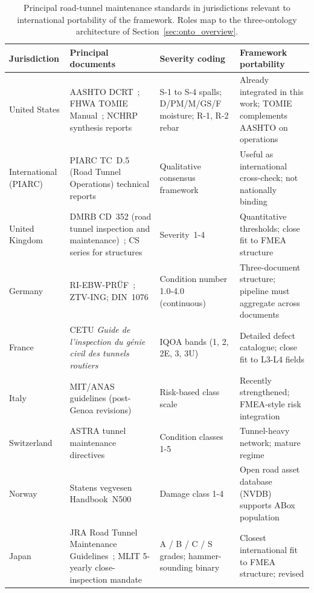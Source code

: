 \documentclass[11pt,a4paper]{article}
\begin{document}
\begin{table}[htbp]
\centering
\caption{Principal road-tunnel maintenance standards in jurisdictions
  relevant to international portability of the framework. Roles map
  to the three-ontology architecture of
  Section~\ref{sec:onto_overview}.}
\label{tab:intl_standards}
\small
\begin{tabularx}{\textwidth}{p{2.0cm} p{3.4cm} p{2.6cm} X}
\toprule
\textbf{Jurisdiction} & \textbf{Principal documents} &
  \textbf{Severity coding} &
  \textbf{Framework portability} \\
\midrule
United States & AASHTO DCRT~\citep{AASHTO2009}; FHWA TOMIE
  Manual~\citep{FHWA2015}; NCHRP synthesis reports &
  S-1 to S-4 spalls; D/PM/M/GS/F moisture; R-1, R-2 rebar &
  Already integrated in this work; TOMIE complements AASHTO on
  operations \\[2pt]
International (PIARC) & PIARC TC~D.5 (Road Tunnel Operations)
  technical reports~\citep{PIARC2017} & Qualitative consensus
  framework & Useful as international cross-check; not nationally
  binding \\[2pt]
United Kingdom & DMRB CD~352 (road tunnel inspection and
  maintenance)~\citep{DMRB2020}; CS series for structures &
  Severity~1-4 & Quantitative thresholds; close fit to FMEA
  structure \\[2pt]
Germany & RI-EBW-PR\"UF~\citep{RIEBWPRUEF}; ZTV-ING; DIN~1076 &
  Condition number 1.0-4.0 (continuous) &
  Three-document structure; pipeline must aggregate across
  documents \\[2pt]
France & CETU \emph{Guide de l'inspection du g\'enie civil des tunnels
  routiers}~\citep{CETU2015} & IQOA bands (1, 2, 2E, 3, 3U) &
  Detailed defect catalogue; close fit to L3-L4 fields \\[2pt]
Italy & MIT/ANAS guidelines (post-Genoa
  revisions)~\citep{MIT2020} & Risk-based class scale &
  Recently strengthened; FMEA-style risk integration \\[2pt]
Switzerland & ASTRA tunnel maintenance directives~\citep{ASTRA2019} &
  Condition classes 1-5 & Tunnel-heavy network; mature regime \\[2pt]
Norway & Statens vegvesen Handbook~N500~\citep{N500} &
  Damage class 1-4 & Open road asset database (NVDB) supports
  ABox population \\[2pt]
Japan & JRA Road Tunnel Maintenance Guidelines~\citep{JRA2019};
  MLIT 5-yearly close-inspection mandate &
  A / B / C / S grades; hammer-sounding binary &
  Closest international fit to FMEA structure; revised

\end{tabularx}
\end{table}
\end{document}
